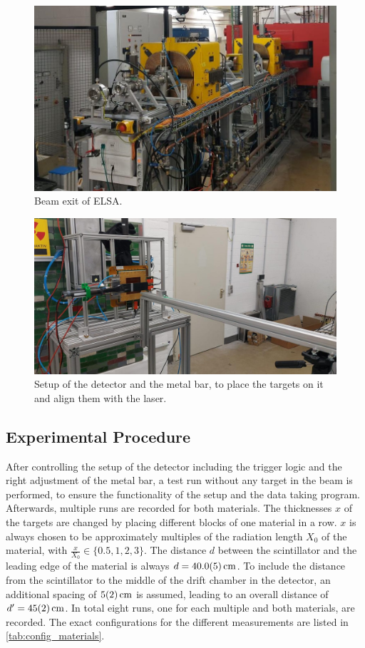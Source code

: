 \documentclass[sn-mathphys-num,iicol]{sn-jnl}
\theoremstyle{thmstyleone}
\theoremstyle{thmstyletwo}
\theoremstyle{thmstylethree}
\begin{document}
\begin{figure}
  \includegraphics[width=\linewidth]{figures/beam_setup_elsa.jpg}
  \caption{Beam exit of ELSA.}
  \label{fig:beam_setup_elsa}
\end{figure}

\begin{figure}
  \includegraphics[width=\linewidth]{figures/detector_setup_elsa.jpg}
  \caption{Setup of the detector and the metal bar, to place the targets on it and align them with the laser.}
  \label{fig:detector_setup_elsa}
\end{figure}

\subsection{Experimental Procedure}
After controlling the setup of the detector including the trigger logic and the right adjustment of the metal bar, a test run without any target in the beam is performed, to ensure the functionality of the setup and the data taking program.
Afterwards, multiple runs are recorded for both materials.
The thicknesses $x$ of the targets are changed by placing different blocks of one material in a row. 
$x$ is always chosen to be approximately multiples of the radiation length $X_0$ \cite{radlength} of the material, with $\tfrac{x}{X_0}\in\{0.5,1,2,3\}$. 
The distance $d$ between the scintillator and the leading edge of the material is always $d=\SI{40\pm0.5}{cm}$.
To include the distance from the scintillator to the middle of the drift chamber in the detector, an additional spacing of $\SI{5\pm2}{cm}$ is assumed, leading to an overall distance of $d'=\SI{45\pm2}{cm}$.
In total eight runs, one for each multiple and both materials, are recorded. 
The exact configurations for the different measurements are listed in \autoref{tab:config_materials}.
\end{document}
